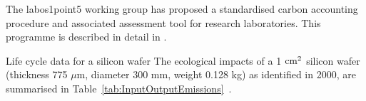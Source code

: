 \documentclass[../SustainableHEP.tex]{subfiles}
\begin{document}
 The labos1point5 working group has proposed a standardised carbon accounting procedure and associated assessment tool for research laboratories. This programme is described in detail in .

\begin{bestpractice}
{Life cycle data for a silicon wafer}%
The ecological impacts of a  1 ${\rm cm}^2$ silicon wafer (thickness 775 $\mu$m, diameter 300 mm, weight 0.128 kg) as identified in 2000, are summarised in Table~\ref{tab:InputOutputEmissions}~\cite{ProBasSi}.
\\
\bigskip
{
\centering
\captionsetup{type=table}
}
\end{bestpractice}
\end{document}
